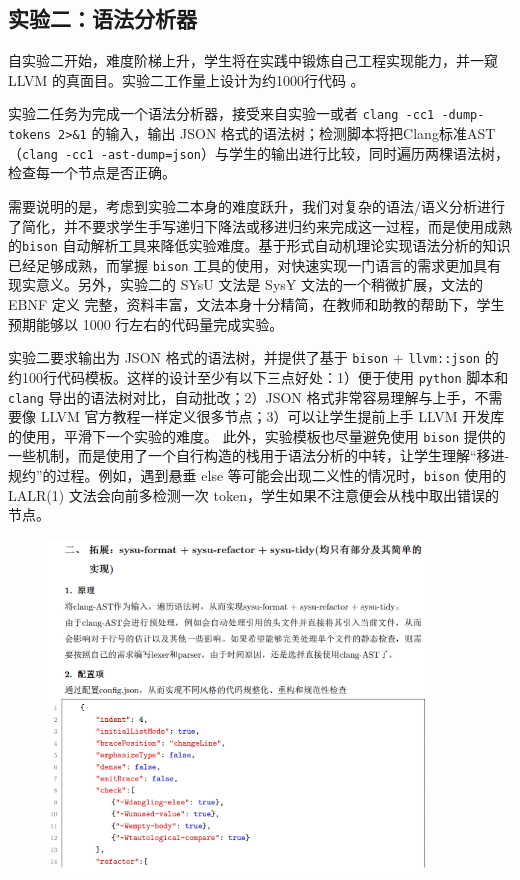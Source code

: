 \documentclass{SCIS2020cn}
\begin{document}
\subsection{实验二：语法分析器}

自实验二开始，难度阶梯上升，学生将在实践中锻炼自己工程实现能力，并一窥 LLVM 的真面目。实验二工作量上设计为约1000行代码
。

实验二任务为完成一个语法分析器，接受来自实验一或者 \texttt{clang -cc1 -dump-tokens 2>\&1} 的输入，输出 JSON 格式的语法树；检测脚本将把Clang标准AST（\texttt{clang -cc1 -ast-dump=json}）与学生的输出进行比较，同时遍历两棵语法树，检查每一个节点是否正确。

需要说明的是，考虑到实验二本身的难度跃升，我们对复杂的语法/语义分析进行了简化，并不要求学生手写递归下降法或移进归约来完成这一过程，而是使用成熟的\texttt{bison} 自动解析工具来降低实验难度。基于形式自动机理论实现语法分析的知识已经足够成熟，而掌握 \texttt{bison} 工具的使用，对快速实现一门语言的需求更加具有现实意义。另外，实验二的 SYsU 文法是 SysY 文法的一个稍微扩展，文法的 EBNF 定义\cite{sysy} 完整，资料丰富，文法本身十分精简，在教师和助教的帮助下，学生预期能够以 1000 行左右的代码量完成实验。

实验二要求输出为 JSON 格式的语法树，并提供了基于 \texttt{bison} + \texttt{llvm::json} 的约100行代码模板。这样的设计至少有以下三点好处：1）便于使用 \texttt{python} 脚本和 \texttt{clang} 导出的语法树对比，自动批改；2）JSON 格式非常容易理解与上手，不需要像 LLVM 官方教程\cite{llvm_manual1}一样定义很多节点；3）可以让学生提前上手 LLVM 开发库的使用，平滑下一个实验的难度。
此外，实验模板也尽量避免使用 \texttt{bison} 提供的一些机制，而是使用了一个自行构造的栈用于语法分析的中转，让学生理解``移进-规约''的过程。例如，遇到悬垂 else 等可能会出现二义性的情况时，\texttt{bison} 使用的 LALR(1) 文法会向前多检测一次 token，学生如果不注意便会从栈中取出错误的节点。

\begin{figure}
    \centering
    \includegraphics[width=0.9\textwidth]{assets/image/report1}
    \label{report1}
\end{figure}
\end{document}
